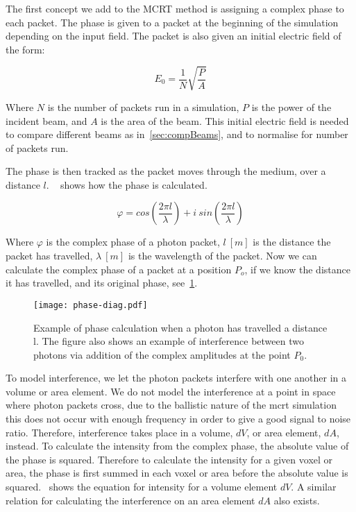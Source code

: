The first concept we add to the MCRT method is assigning a complex phase to each packet.
The phase is given to a packet at the beginning of the simulation depending on the input field.
The packet is also given an initial electric field of the form:

\begin{equation}
E_0 = \frac{1}{N}\sqrt{\frac{P}{A}}
\label{eqn:initefield}
\end{equation}

Where $N$ is the number of packets run in a simulation, $P$ is the power of the incident beam, and $A$ is the area of the beam.
This initial electric field is needed to compare different beams as in~\cref{sec:compBeams}, and to normalise for number of packets run.

The phase is then tracked as the packet moves through the medium, over a distance $l$.
~ shows how the phase is calculated.

\begin{equation}
    \varphi = cos\left(\frac{2 \pi l}{\lambda}\right) + i\ sin\left(\frac{2 \pi l}{\lambda}\right)
    \label{eqn:phase}
\end{equation}

Where $\varphi$ is the complex phase of a photon packet, $l\ [m]$ is the distance the packet has travelled, $\lambda~[m]$ is the wavelength of the packet.
Now we can calculate the complex phase of a packet at a position $P_o$, if we know the distance it has travelled, and its original phase, see~\cref{fig:phase-diag}.

\begin{figure}[!ht]
    \centering
    \texttt{[image: phase-diag.pdf]}
    \caption{Example of phase calculation when a photon has travelled a distance l. The figure also shows an example of interference between two photons via addition of the complex amplitudes at the point $P_0$.}
    \label{fig:phase-diag}
\end{figure}

To model interference, we let the photon packets interfere with one another in a volume or area element. 
We do not model the interference at a point in space where photon packets cross, due to the ballistic nature of the \gls*{mcrt} simulation this does not occur with enough frequency in order to give a good signal to noise ratio. 
Therefore, interference takes place in a volume, $dV$, or area element, $dA$, instead.
To calculate the intensity from the complex phase, the absolute value of the phase is squared.
Therefore to calculate the intensity for a given voxel or area, the phase is first summed in each voxel or area before the absolute value is squared.~ shows the equation for intensity for a volume element $dV$. A similar relation for calculating the interference on an area element $dA$ also exists.

